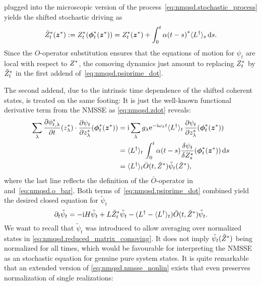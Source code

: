 plugged into the microscopic version of the process~\ref{eq:nmqsd.stochastic_process} yields the shifted stochastic driving as
\begin{equation}
  {\tilde Z}^*_t({\boldsymbol{z}}^*) := {Z}^*_t({\boldsymbol{\phi}}^*_t({\boldsymbol{z}}^*)) = {Z}^*_t({\boldsymbol{z}}^*) + \int_0^t {\alpha(t-s)}^* \langle L^\dagger \rangle_s \, \mathrm{d} s.
  \label{eq:stochastic_process_shiften}
\end{equation}
Since the $O$-operator substitution ensures that the equations of motion for $\psi_t$ are local with respect to ${Z}^*$, the comoving dynamics just amount to replacing ${Z}^*_t$ by ${\tilde Z}^*_t$ in the first addend of~\ref{eq:nmqsd.psiprime_dot}.

The second addend, due to the intrinsic time dependence of the shifted coherent states, is treated on the same footing:
It is just the well-known functional derivative term from the NMSSE as \autoref{eq:nmqsd.zdot} reveals:
\begin{align*}
  \sum_\lambda \frac{\partial\ccphitla}{\partial t}(\cc z_\lambda) \cdot \frac{\partial\psi_t}{\partial \cc z_\lambda} (\cc{\vec\phi}_t(\cc\zz))
  &= \ii \sum_\lambda g_\lambda \exp[-\ii \omega_\lambda t] \qmean{\adj L}_t \, \frac{\partial\psi_t}{\partial \cc z_\lambda} (\cc{\vec\phi}_t(\cc\zz)) \\
  &= \qmean{\adj L}_t \, \int_0^t \alpha(t - s) \frac{\delta \psi_t}{\delta \ZZ_s} (\cc{\vec\phi}_t(\cc\zz)) \dd s \\
  &= \qmean{\adj L}_t \bar O(t, \tildeZZ) \tilde\psi_t(\tildeZZ),
\end{align*}
where the last line reflects the definition of the $\bar O$-operator in  and~\ref{eq:nmqsd.o_bar}.
Both terms of~\ref{eq:nmqsd.psiprime_dot} combined yield the desired closed equation for $\tilde\psi_t$
\begin{equation}
  \partial_t \tilde\psi_t = -\mathrm{i}H \tilde\psi_t + L{\tilde Z}^*_t\tilde\psi_t - (L^\dagger - \langle L^\dagger \rangle_t) \bar O(t, {\tilde Z}^*) \tilde\psi_t.
  \label{eq:nmqsd.nmsse_nonlin}
\end{equation}
We want to recall that $\tilde\psi_t$ was introduced to allow averaging over normalized states in \autoref{eq:nmqsd.reduced_matrix_comoving}.
It does not imply $\tilde\psi_t({\tilde Z}^*)$ being normalized for all times, which would be favourable for interpreting the NMSSE as an stochastic equation for genuine pure system states.
It is quite remarkable that an extended version of \autoref{eq:nmqsd.nmsse_nonlin} exists that even preserves normalization of single realizations:
